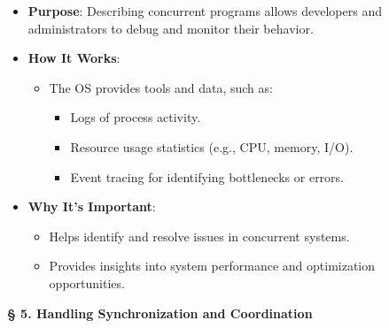 \documentclass[a4paper]{book}
\newcommand{\sfbf}[1]{{\normalsize\textsf{\textbf{§ #1}}}}
\begin{document}
\begin{itemize}
\item 
\textbf{Purpose}: Describing concurrent programs allows developers and administrators to debug and monitor their behavior.

\item 
\textbf{How It Works}:
\begin{itemize}
\item 
The OS provides tools and data, such as:
\begin{itemize}
\item 
Logs of process activity.

\item 
Resource usage statistics (e.g., CPU, memory, I/O).

\item 
Event tracing for identifying bottlenecks or errors.

\end{itemize}

\end{itemize}

\item 
\textbf{Why It's Important}:
\begin{itemize}
\item 
Helps identify and resolve issues in concurrent systems.

\item 
Provides insights into system performance and optimization opportunities.

\end{itemize}

\end{itemize}
\hrulefill

\sfbf{5. Handling Synchronization and Coordination}
\end{document}

